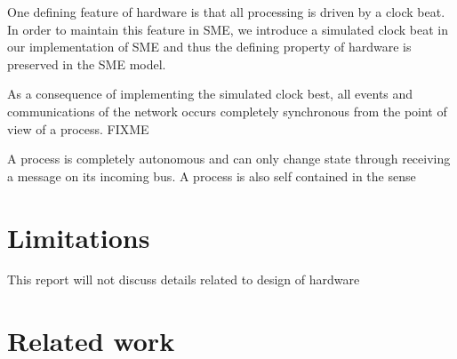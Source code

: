 \begin{property} One defining feature of
    hardware is that all processing is driven by a clock beat. In
    order to maintain this feature in SME, we introduce a simulated
    clock beat in our implementation of SME and thus the defining
    property of hardware is preserved in the SME model.
\end{property}

\begin{property}
  \label{synchro}
  As a consequence of implementing the simulated clock best, all
  events and communications of the network occurs completely
  synchronous from the point of view of a process. FIXME
\end{property}

\begin{property}
  \label{noshare}
  A process is completely autonomous and can only change state through
  receiving a message on its incoming bus. A process is also self
  contained in the sense
\end{property}



\section{Limitations}
This report will not discuss details related to design of hardware

\section{Related work}



